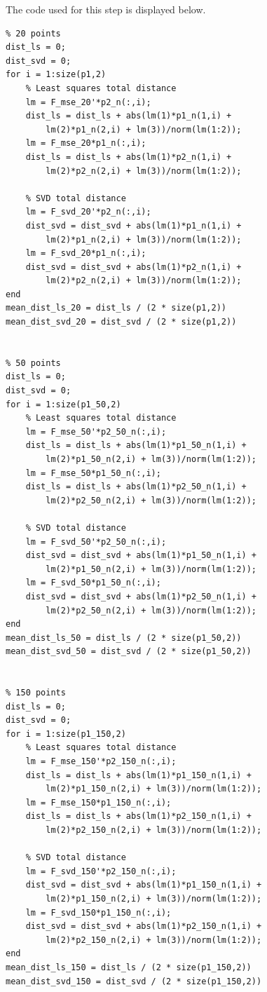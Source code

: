 \documentclass[peerreview,11pt]{IEEEtran}
\begin{document}
The code used for this step is displayed below.

\begin{verbatim}
% 20 points
dist_ls = 0;
dist_svd = 0;
for i = 1:size(p1,2)
    % Least squares total distance
    lm = F_mse_20'*p2_n(:,i);
    dist_ls = dist_ls + abs(lm(1)*p1_n(1,i) + 
        lm(2)*p1_n(2,i) + lm(3))/norm(lm(1:2));
    lm = F_mse_20*p1_n(:,i);
    dist_ls = dist_ls + abs(lm(1)*p2_n(1,i) + 
        lm(2)*p2_n(2,i) + lm(3))/norm(lm(1:2));
    
    % SVD total distance
    lm = F_svd_20'*p2_n(:,i);
    dist_svd = dist_svd + abs(lm(1)*p1_n(1,i) + 
        lm(2)*p1_n(2,i) + lm(3))/norm(lm(1:2));
    lm = F_svd_20*p1_n(:,i);
    dist_svd = dist_svd + abs(lm(1)*p2_n(1,i) + 
        lm(2)*p2_n(2,i) + lm(3))/norm(lm(1:2));
end
mean_dist_ls_20 = dist_ls / (2 * size(p1,2))
mean_dist_svd_20 = dist_svd / (2 * size(p1,2))


% 50 points
dist_ls = 0;
dist_svd = 0;
for i = 1:size(p1_50,2)
    % Least squares total distance
    lm = F_mse_50'*p2_50_n(:,i);
    dist_ls = dist_ls + abs(lm(1)*p1_50_n(1,i) + 
        lm(2)*p1_50_n(2,i) + lm(3))/norm(lm(1:2));
    lm = F_mse_50*p1_50_n(:,i);
    dist_ls = dist_ls + abs(lm(1)*p2_50_n(1,i) + 
        lm(2)*p2_50_n(2,i) + lm(3))/norm(lm(1:2));
    
    % SVD total distance
    lm = F_svd_50'*p2_50_n(:,i);
    dist_svd = dist_svd + abs(lm(1)*p1_50_n(1,i) + 
        lm(2)*p1_50_n(2,i) + lm(3))/norm(lm(1:2));
    lm = F_svd_50*p1_50_n(:,i);
    dist_svd = dist_svd + abs(lm(1)*p2_50_n(1,i) + 
        lm(2)*p2_50_n(2,i) + lm(3))/norm(lm(1:2));
end
mean_dist_ls_50 = dist_ls / (2 * size(p1_50,2))
mean_dist_svd_50 = dist_svd / (2 * size(p1_50,2))


% 150 points
dist_ls = 0;
dist_svd = 0;
for i = 1:size(p1_150,2)
    % Least squares total distance
    lm = F_mse_150'*p2_150_n(:,i);
    dist_ls = dist_ls + abs(lm(1)*p1_150_n(1,i) + 
        lm(2)*p1_150_n(2,i) + lm(3))/norm(lm(1:2));
    lm = F_mse_150*p1_150_n(:,i);
    dist_ls = dist_ls + abs(lm(1)*p2_150_n(1,i) + 
        lm(2)*p2_150_n(2,i) + lm(3))/norm(lm(1:2));
    
    % SVD total distance
    lm = F_svd_150'*p2_150_n(:,i);
    dist_svd = dist_svd + abs(lm(1)*p1_150_n(1,i) + 
        lm(2)*p1_150_n(2,i) + lm(3))/norm(lm(1:2));
    lm = F_svd_150*p1_150_n(:,i);
    dist_svd = dist_svd + abs(lm(1)*p2_150_n(1,i) + 
        lm(2)*p2_150_n(2,i) + lm(3))/norm(lm(1:2));
end
mean_dist_ls_150 = dist_ls / (2 * size(p1_150,2))
mean_dist_svd_150 = dist_svd / (2 * size(p1_150,2))
\end{verbatim}
\end{document}
